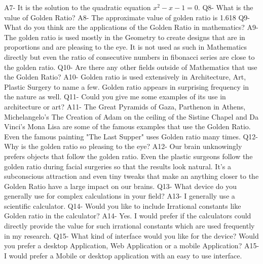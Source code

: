 \documentclass[12pt]{article}
\begin{document}
A7- It is the solution to the quadratic equation $x^2-x-1=0$.\newline\newline\newline
Q8- What is the value of Golden Ratio?\newline
A8- The approximate value of golden ratio is 1.618\newline\newline
Q9-What do you think are the applications of the Golden Ratio in mathematics?\newline
A9- The golden ratio is used mostly in the Geometry to create designs that are in proportions and are pleasing to the eye. It is not used as such in Mathematics directly but even the ratio of consecutive numbers in fibonacci series are close to the golden ratio.\newline\newline
Q10- Are there any other fields outside of Mathematics that use the Golden Ratio?\newline
A10- Golden ratio is used extensively in Architecture, Art, Plastic Surgery to name a few. Golden ratio appears in surprising frequency in the nature as well.\newline\newline
Q11- Could you give me some examples of its use in architecture or art?\newline
A11- The Great Pyramids of Gaza, Parthenon in Athens, Michelangelo’s The Creation of Adam on the ceiling of the Sistine Chapel and Da Vinci’s Mona Lisa are some of the famous examples that use the Golden Ratio. Even the famous painting "The Last Supper" uses Golden ratio many times.\newline\newline
Q12- Why is the golden ratio so pleasing to the eye?\newline
A12- Our brain unknowingly prefers objects that follow the golden ratio. Even the plastic surgeons follow the golden ratio during facial surgeries so that the results look natural. It’s a subconscious attraction and even tiny tweaks that make an anything closer to the Golden Ratio have a large impact on our brains.\newline\newline
Q13- What device do you generally use for complex calculations in your field?\newline
A13- I generally use a scientific calculator.\newline\newline
Q14- Would you like to include Irrational constants like Golden ratio in the calculator?\newline
A14- Yes. I would prefer if the calculators could directly provide the value for such irrational constants which are used frequently in my research.\newline\newline
Q15- What kind of interface would you like for the device? Would you prefer a desktop Application, Web Application or a mobile Application?\newline
A15- I would prefer a Mobile or desktop application with an easy to use interface.\newline
\end{document}
